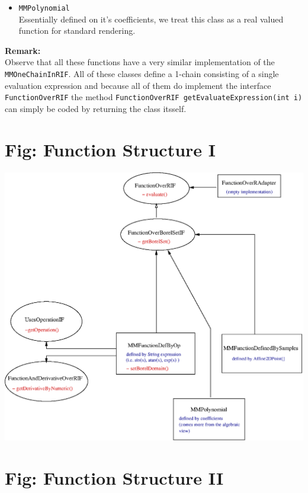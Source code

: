 \documentclass[a4paper,12pt]{book}
\begin{document}
\begin{appendix}
\begin{itemize}
\item {\texttt {MMPolynomial}}\\
Essentially defined on it's coefficients, we treat this class as a real valued function for
standard rendering.
\end{itemize}

{\textbf {Remark:}}\\
Observe that all these functions have a very similar implementation of the {\texttt {MMOneChainInRIF}}. All of these classes define a 1-chain consisting of a single evaluation expression
and because all of them do implement the interface {\texttt {FunctionOverRIF}} the method {\texttt {FunctionOverRIF getEvaluateExpression(int i)}} can simply be coded by returning the
class itsself.
\section{Fig: Function Structure I}
{\includegraphics{images/FunctionStructureInMath}}

\section{Fig: Function Structure II}


\end{appendix}
\end{document}
